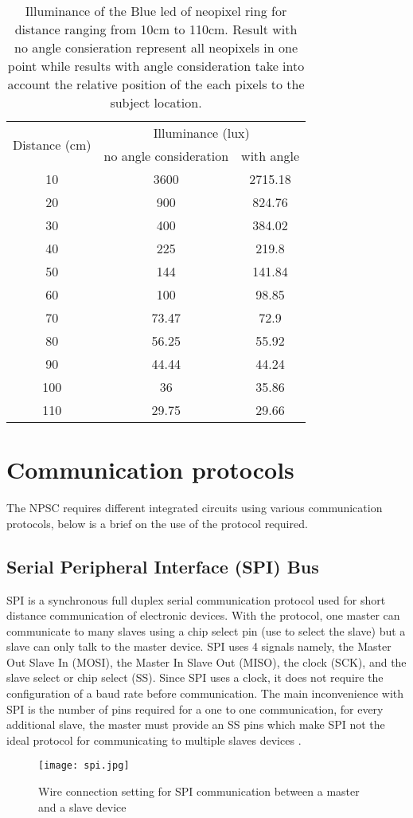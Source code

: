 \begin{table}[h!]
\centering
\caption{Illuminance of the Blue led of neopixel ring for distance ranging from 10cm to 110cm. Result with no angle consieration represent all neopixels in one point while results with angle consideration take into account the relative position of the each pixels to the subject location.}
\label{table:neopixel_illuminance}
\begin{tabular}{ccc}
\hline
\hline
\multirow{2}{*}{Distance (cm)}  & \multicolumn{2}{c}{Illuminance (lux)} \\  
 & no angle consideration & with angle \\
\hline
10 & 3600 & 2715.18\\
20 & 900 & 824.76\\
30 & 400 & 384.02\\
40 & 225 & 219.8\\
50 & 144 & 141.84\\
60 & 100 & 98.85\\
70 & 73.47 & 72.9\\
80 & 56.25 & 55.92\\
90 & 44.44 & 44.24\\
100 & 36 & 35.86\\
110 & 29.75 & 29.66\\
\hline
\hline
\end{tabular}
\end{table}
\section{Communication protocols}\label{com_protocols}
The NPSC requires different integrated circuits using various communication protocols, below is a brief on the use of the protocol required.

\subsection{Serial Peripheral Interface (SPI) Bus}
SPI is a synchronous full duplex serial communication protocol used for short distance communication of electronic devices. With the protocol, one master can communicate to many slaves using a chip select pin (use to select the slave) but a slave can only talk to the master device. SPI uses 4 signals namely, the Master Out Slave In (MOSI), the Master In Slave Out (MISO), the clock (SCK), and the slave select or chip select (SS). Since SPI uses a clock, it does not require the configuration of a baud rate before communication. The main inconvenience with SPI is the number of pins required for a one to one communication, for every additional slave, the master must provide an SS pins which make SPI not the ideal protocol for communicating to multiple slaves devices \cite{spi}. 
\begin{figure}[h!]
\centering
\texttt{[image: spi.jpg]}
\caption{Wire connection setting for SPI communication between a master and a slave device}
\label{fig:spi_coms}
\end{figure}
